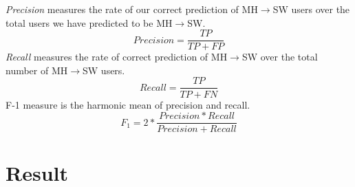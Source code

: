 \textit{Precision} measures the rate of our correct prediction of MH$\rightarrow$SW users over the total users we have predicted to be MH$\rightarrow$SW.
\begin{equation*}
Precision = \frac{TP}{TP + FP}
\end{equation*}
\textit{Recall} measures the rate of correct prediction of MH$\rightarrow$SW over the total number of MH$\rightarrow$SW users.
\begin{equation*}
Recall = \frac{TP}{TP + FN}
\end{equation*}
 F-1 measure is the harmonic mean of precision and recall.
\begin{equation*}
F_1 = 2 * \frac{Precision * Recall}{Precision + Recall}
\end{equation*}
\section{Result}
